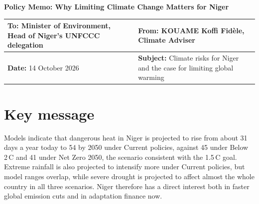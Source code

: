\documentclass[12pt,a4paper]{article}
\newcommand{\degC}{\,\textdegree C}
\begin{document}
\begin{center}
{\large\bfseries Policy Memo: Why Limiting Climate Change Matters for Niger}
\end{center}
\vspace{-10pt}

{\small\singlespacing
\renewcommand{\arraystretch}{1.25}
\begin{tabularx}{\linewidth}{|>{\raggedright\arraybackslash}X|>{\raggedright\arraybackslash}X|}
\hline
\textbf{To:} Minister of Environment, Head of Niger's UNFCCC delegation &
\textbf{From:} KOUAME Koffi Fidèle, Climate Adviser \\
\hline
\textbf{Date:} 14 October 2026 &
\textbf{Subject:} Climate risks for Niger and the case for limiting global warming \\
\hline
\end{tabularx}}

\section{Key message}
Models indicate that dangerous heat in Niger is projected to rise from about 31 days a year today to 54 by 2050
under Current policies, against 45 under Below 2\degC{} and 41 under Net Zero 2050, the scenario consistent with
the 1.5\degC{} goal. Extreme rainfall is also projected to intensify more under Current policies, but model ranges
overlap, while severe drought is projected to affect almost the whole country in all three scenarios. Niger
therefore has a direct interest both in faster global emission cuts and in adaptation finance now.
\end{document}
